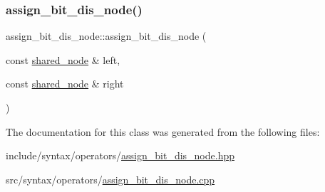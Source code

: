 \subsubsection{\texorpdfstring{assign\+\_\+bit\+\_\+dis\+\_\+node()}{assign\_bit\_dis\_node()}}
{\footnotesize\ttfamily assign\+\_\+bit\+\_\+dis\+\_\+node\+::assign\+\_\+bit\+\_\+dis\+\_\+node (\begin{DoxyParamCaption}\item[{const \hyperlink{namespacejawe_a3f307481d921b6cbb50cc8511fc2b544}{shared\+\_\+node} \&}]{left,  }\item[{const \hyperlink{namespacejawe_a3f307481d921b6cbb50cc8511fc2b544}{shared\+\_\+node} \&}]{right }\end{DoxyParamCaption})}



The documentation for this class was generated from the following files\+:\begin{DoxyCompactItemize}
\item 
include/syntax/operators/\hyperlink{assign__bit__dis__node_8hpp}{assign\+\_\+bit\+\_\+dis\+\_\+node.\+hpp}\item 
src/syntax/operators/\hyperlink{assign__bit__dis__node_8cpp}{assign\+\_\+bit\+\_\+dis\+\_\+node.\+cpp}\end{DoxyCompactItemize}

